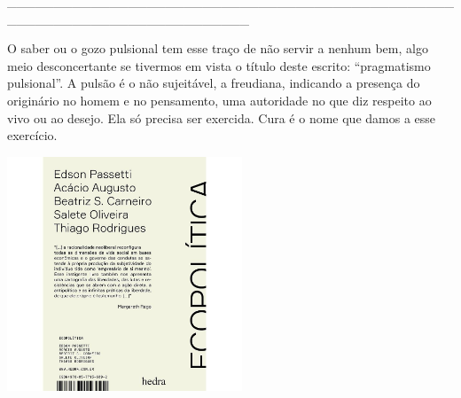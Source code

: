 \hspace*{-2cm}\_\_\_\_\_\_\_\_\_\_\_\_\_\_\_\_\_\_\_\_\_\_\_\_\_\_\_\_\_\_\_\_\_\_\_\_\_\_\_\_\_\_\_\_\_\_\_\_\_\_\_\_\_\_\_\_\_\_\_\_\_\_\_\_\_\_\_\_\_\_\_\_\_\_

\medskip

\noindent{}O saber ou o gozo pulsional tem esse traço de não servir a nenhum bem, algo meio desconcertante se tivermos em vista o título deste escrito: “pragmatismo pulsional”. A pulsão é o não sujeitável, a {} freudiana, indicando a presença do originário no homem e no pensamento, uma autoridade no que diz respeito ao vivo ou ao desejo. Ela só precisa ser exercida. Cura é o nome que damos a esse exercício.

\hspace{.5cm}

\hspace*{-.4cm}\begin{minipage}[c]{0.90\linewidth}
\small{
{}}
\end{minipage}

\pagebreak

\hspace{.5cm}

\begin{center}
\hspace*{-.5cm}\includegraphics[width=70mm]{eco.jpeg}
\end{center}

